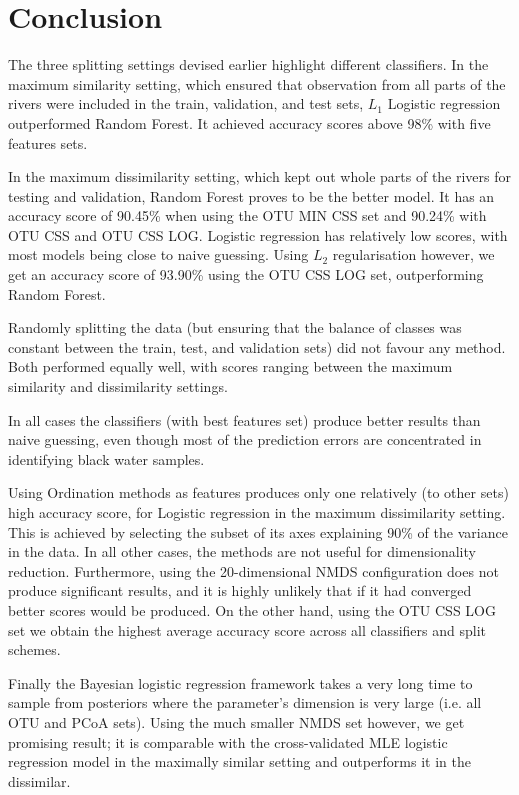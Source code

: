 
\chapter{Conclusion}
The three splitting settings devised earlier highlight different classifiers. 
In the maximum similarity setting, which ensured that observation from all parts of the rivers were included in the train, validation, and test sets, $L_1$ Logistic regression outperformed Random Forest. It achieved accuracy scores above 98\% with five features sets. 

In the maximum dissimilarity setting, which kept out whole parts of the rivers for testing and validation, Random Forest proves to be the better model. It has an accuracy score of 90.45\% when using the OTU MIN CSS set and 90.24\% with OTU CSS and OTU CSS LOG. Logistic regression has relatively low scores, with most models being close to naive guessing. Using $L_2$ regularisation however, we get an accuracy score of 93.90\% using the OTU CSS LOG set, outperforming Random Forest.

Randomly splitting the data (but ensuring that the balance of classes was constant between the train, test, and validation sets) did not favour any method. Both performed equally well, with scores ranging between the maximum similarity and dissimilarity settings.

In all cases the classifiers (with best features set) produce better results than naive guessing, even though most of the prediction errors are concentrated in identifying black water samples. 

Using Ordination methods as features produces only one relatively (to other sets) high accuracy score, for Logistic regression in the maximum dissimilarity setting. This is achieved by selecting the subset of its axes explaining 90\% of the variance in the data. In all other cases, the methods are not useful for dimensionality reduction. Furthermore, using the 20-dimensional NMDS configuration does not produce significant results, and it is highly unlikely that if it had converged better scores would be produced. On the other hand, using the OTU CSS LOG set we obtain the highest average accuracy score across all classifiers and split schemes. 


Finally the Bayesian logistic regression framework takes a very long time to sample from posteriors where the parameter's dimension is very large (i.e. all OTU and PCoA sets). Using the much smaller NMDS set however, we get promising result; it is comparable with the cross-validated MLE logistic regression model in the maximally similar setting and outperforms it in the dissimilar. 

